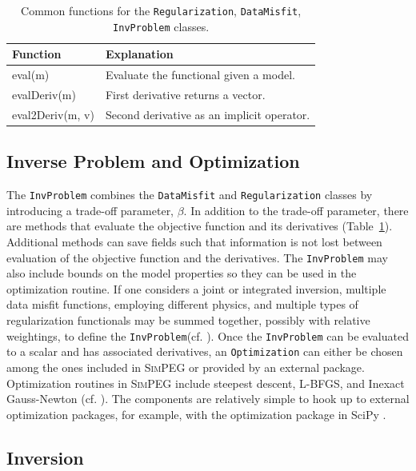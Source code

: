\documentclass[preprint,review,3p,times,onecolumn,authoryear]{elsarticle}
\newcommand{\SimPEG}{\textsc{SimPEG}\xspace}
\newcommand{\Regularization}{\texttt{Regularization}\xspace}
\newcommand{\DataMisfit}{\texttt{DataMisfit}\xspace}
\newcommand{\Optimization}{\texttt{Optimization}\xspace}
\newcommand{\InvProblem}{\texttt{InvProblem}\xspace}
\begin{document}
{%
\begin{table}[ht]
\caption{Common functions for the \Regularization, \DataMisfit, \InvProblem classes.}
\scriptsize
\label{table:Dmis_and_Reg}
  \begin{tabular}{  p{2.5cm}  p{4.5cm} }
    \hline

    Function & Explanation \\ \hline

    eval(m)          & Evaluate the functional given a model.\\
    evalDeriv(m)     & First derivative returns a vector.\\
    eval2Deriv(m, v) & Second derivative as an implicit operator.\\

    \hline
  \end{tabular}
\end{table}
}

\subsection*{Inverse Problem and Optimization}

The \InvProblem combines the \DataMisfit and \Regularization classes by introducing a
trade-off parameter, $\beta$. In addition to the trade-off parameter, there are
methods that evaluate the objective function and its derivatives (Table~\ref{table:Dmis_and_Reg}). Additional methods can save fields
such that information is not lost between evaluation of the objective function and the derivatives.
The \InvProblem may also include bounds on the model properties so they can be used in the optimization routine.
If one considers a joint or integrated inversion, multiple data misfit functions, employing different physics, and multiple types of regularization functionals may be summed together, possibly with relative weightings, to define the \InvProblem (cf. \cite{lines1988cooperative,Holtham2010,HeagySEG2014}).
Once the \InvProblem can be evaluated to a scalar and has associated derivatives, an \Optimization can either be chosen among the ones included in \SimPEG or provided by an external package.
Optimization routines in \SimPEG include steepest descent, L-BFGS, and Inexact Gauss-Newton (cf. \cite{Nocedal1999}).
The components are relatively simple to hook up to external optimization packages, for example, with the optimization package in SciPy \citep{scipy}.

\subsection{Inversion}
\end{document}
